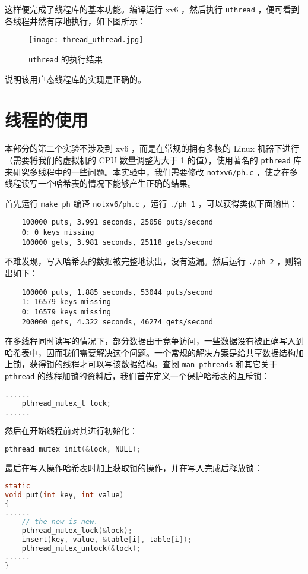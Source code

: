 这样便完成了线程库的基本功能。编译运行 xv6 ，然后执行 \lstinline{uthread} ，便可看到各线程井然有序地执行，如下图所示：
\begin{figure}[H]
  \centering
  \texttt{[image: thread\_uthread.jpg]}
  \caption{ \lstinline{uthread} 的执行结果}
\end{figure}
说明该用户态线程库的实现是正确的。

\section{线程的使用}

本部分的第二个实验不涉及到 xv6 ，而是在常规的拥有多核的 Linux 机器下进行（需要将我们的虚拟机的 CPU 数量调整为大于 1 的值），使用著名的 \lstinline{pthread} 库来研究多线程中的一些问题。本实验中，我们需要修改 \lstinline{notxv6/ph.c} ，使之在多线程读写一个哈希表的情况下能够产生正确的结果。

首先运行 \lstinline{make ph} 编译 \lstinline{notxv6/ph.c} ，运行 \lstinline{./ph 1} ，可以获得类似下面输出：
\begin{lstlisting}
    100000 puts, 3.991 seconds, 25056 puts/second
    0: 0 keys missing
    100000 gets, 3.981 seconds, 25118 gets/second
\end{lstlisting}

不难发现，写入哈希表的数据被完整地读出，没有遗漏。然后运行 \lstinline{./ph 2} ，则输出如下：
\begin{lstlisting}
    100000 puts, 1.885 seconds, 53044 puts/second
    1: 16579 keys missing
    0: 16579 keys missing
    200000 gets, 4.322 seconds, 46274 gets/second
\end{lstlisting}

在多线程同时读写的情况下，部分数据由于竞争访问，一些数据没有被正确写入到哈希表中，因而我们需要解决这个问题。一个常规的解决方案是给共享数据结构加上锁，获得锁的线程才可以写该数据结构。查阅 \lstinline{man pthreads} 和其它关于 \lstinline{pthread} 的线程加锁的资料后，我们首先定义一个保护哈希表的互斥锁：
\begin{lstlisting}[language=C]
......
    pthread_mutex_t lock;
......
\end{lstlisting}
然后在开始线程前对其进行初始化：
\begin{lstlisting}[language=C]
    pthread_mutex_init(&lock, NULL);
\end{lstlisting}
最后在写入操作哈希表时加上获取锁的操作，并在写入完成后释放锁：
\begin{lstlisting}[language=C]
static 
void put(int key, int value)
{
......
    // the new is new.
    pthread_mutex_lock(&lock);
    insert(key, value, &table[i], table[i]);
    pthread_mutex_unlock(&lock);
......  
}
\end{lstlisting}

